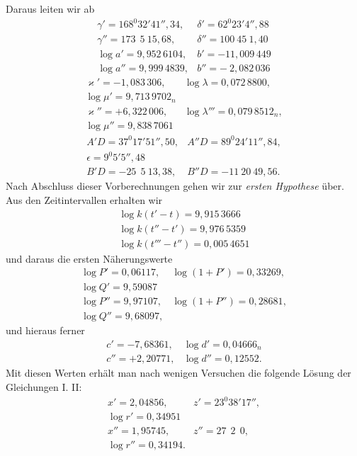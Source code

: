 Daraus leiten wir ab
\[
\begin{array}{ll}
\gamma' = 168^{0}32'41''{,}34, & \delta' = 62^{0}23'4''{,}88 \\
\gamma'' = 173\ \ 5\ 15{,}68, & \delta'' = 100\ 45\ 1{,}40 \\
\log a' = 9{,}952\,6104, & b' = -11{,}009\,449 \\
\log a'' = 9{,}999\,4839, & b'' = -\ 2{,}082\,036
\end{array}
\]
\[
\begin{array}{ll}
\varkappa' = -1{,}083\,306, & \log \lambda = 0{,}072\,8800,\\
\log \mu' = 9{,}713\,9702_n & \\
\varkappa'' = +6{,}322\,006, & \log \lambda''' = 0{,}079\,8512_n,\\
\log \mu'' = 9{,}838\,7061 & 
\end{array}
\]
\[
\begin{array}{ll}
A'D = 37^{0}17'51''{,}50, & A''D = 89^{0}24'11''{,}84,\\
\epsilon = 9^{0}5'5''{,}48 & \\
B'D = -25\ \ 5\ 13{,}38, & B''D = -11\ 20\ 49{,}56.
\end{array}
\]
Nach Abschluss dieser Vorberechnungen gehen wir zur \emph{ersten Hypothese} über. Aus den
Zeitintervallen erhalten wir
\[
\begin{array}{l}
\log k(t'-t) = 9{,}915\,3666 \\
\log k(t''-t') = 9{,}976\,5359 \\
\log k(t'''-t'') = 0{,}005\,4651
\end{array}
\]
und daraus die ersten Näherungswerte
\[
\begin{array}{ll}
\log P' = 0{,}06117, & \log(1+P') = 0{,}33269,\\
\log Q' = 9{,}59087 & \\
\log P'' = 9{,}97107, & \log(1+P'') = 0{,}28681,\\
\log Q'' = 9{,}68097, & 
\end{array}
\]
und hieraus ferner
\[
\begin{array}{ll}
c' = -7{,}68361, & \log d' = 0{,}04666_n \\
c'' = +2{,}20771, & \log d'' = 0{,}12552.
\end{array}
\]
Mit diesen Werten erhält man nach wenigen Versuchen
die folgende Lösung der Gleichungen I. II:
\[
\begin{array}{ll}
x' = 2{,}04856, & z' = 23^{0}38'17'',\\
\log r' = 0{,}34951 & \\
x'' = 1{,}95745, & z'' = 27\ \ 2\ \ 0,\\
\log r'' = 0{,}34194. & 
\end{array}
\]
